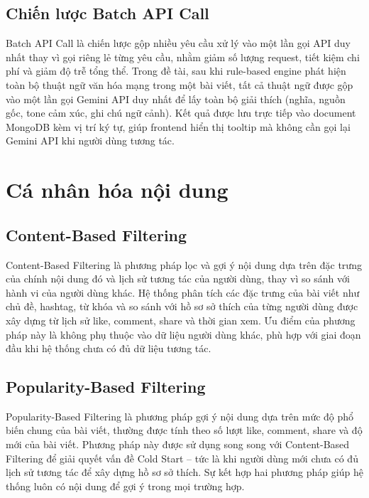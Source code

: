 \subsection{Chiến lược Batch API
Call}\label{chiux1ebfn-lux1b0ux1ee3c-batch-api-call}

Batch API Call là chiến lược gộp nhiều yêu cầu xử lý vào một lần gọi API
duy nhất thay vì gọi riêng lẻ từng yêu cầu, nhằm giảm số lượng request,
tiết kiệm chi phí và giảm độ trễ tổng thể. Trong đề tài, sau khi
rule-based engine phát hiện toàn bộ thuật ngữ văn hóa mạng trong một bài
viết, tất cả thuật ngữ được gộp vào một lần gọi Gemini API duy nhất để
lấy toàn bộ giải thích (nghĩa, nguồn gốc, tone cảm xúc, ghi chú ngữ
cảnh). Kết quả được lưu trực tiếp vào document MongoDB kèm vị trí ký tự,
giúp frontend hiển thị tooltip mà không cần gọi lại Gemini API khi người
dùng tương tác.

\section{Cá nhân hóa nội
dung}\label{cuxe1-nhuxe2n-huxf3a-nux1ed9i-dung}

\subsection{Content-Based Filtering}\label{content-based-filtering}

Content-Based Filtering là phương pháp lọc và gợi ý nội dung dựa trên
đặc trưng của chính nội dung đó và lịch sử tương tác của người dùng,
thay vì so sánh với hành vi của người dùng khác. Hệ thống phân tích các
đặc trưng của bài viết như chủ đề, hashtag, từ khóa và so sánh với hồ sơ
sở thích của từng người dùng được xây dựng từ lịch sử like, comment,
share và thời gian xem. Ưu điểm của phương pháp này là không phụ thuộc
vào dữ liệu người dùng khác, phù hợp với giai đoạn đầu khi hệ thống chưa
có đủ dữ liệu tương tác.

\subsection{Popularity-Based
Filtering}\label{popularity-based-filtering}

Popularity-Based Filtering là phương pháp gợi ý nội dung dựa trên mức độ
phổ biến chung của bài viết, thường được tính theo số lượt like,
comment, share và độ mới của bài viết. Phương pháp này được sử dụng song
song với Content-Based Filtering để giải quyết vấn đề Cold Start -- tức
là khi người dùng mới chưa có đủ lịch sử tương tác để xây dựng hồ sơ sở
thích. Sự kết hợp hai phương pháp giúp hệ thống luôn có nội dung để gợi
ý trong mọi trường hợp.

